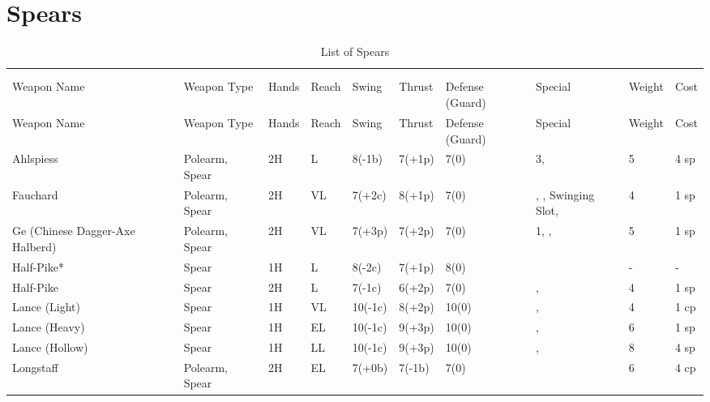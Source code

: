 \documentclass[oneside,11pt,english]{book}
\begin{document}
\section{Spears}\vspace{-15pt}
\begin{longtabu} to 1\linewidth {X[2,l] X X[-1,c] X[-1,c] XX X[-1,c] X[2,l] X[-3,c] X[-3,r]}
	\captionsetup{labelformat=blank,textformat=empty}
	\caption{List of Spears}\vspace{-15pt}\\
	\label{tab:Spears}\\
	Weapon Name						&Weapon Type			&Hands	&Reach	&Swing		&Thrust	&Defense (Guard)	&Special																	&Weight	&Cost\\\toprule\endfirsthead
Weapon Name						&Weapon Type			&Hands	&Reach	&Swing		&Thrust	&Defense (Guard)	&Special																	&Weight	&Cost\\\toprule\endhead
Ahlspiess 						&Polearm, Spear			&2H		&L		&8(-1b)		&7(+1p) &7(0)				& 3, 													&5		&4 sp\\
Fauchard 						&Polearm, Spear			&2H		&VL 	&7(+2c)		&8(+1p) &7(0)				&, , Swinging Slot,								&4		&1 sp\\
Ge (Chinese Dagger-Axe Halberd)	&Polearm, Spear			&2H		&VL 	&7(+3p)		&7(+2p) &7(0)				& 1, , 											&5		&1 sp\\
Half-Pike*						&Spear					&1H		&L		&8(-2c)		&7(+1p) &8(0)				&																&-		&-\\
Half-Pike 						&Spear 					&2H		&L		&7(-1c)		&6(+2p) &7(0)				&,  													&4		&1 sp\\
Lance (Light) 					&Spear 					&1H		&VL		&10(-1c)	&8(+2p) &10(0)				&,  												&4		&1 cp\\
Lance (Heavy) 					&Spear 					&1H		&EL		&10(-1c)	&9(+3p) &10(0)				&,  												&6		&1 sp\\
Lance (Hollow) 					&Spear 					&1H		&LL		&10(-1c)	&9(+3p) &10(0)				&,  												&8		&4 sp\\
Longstaff 						&Polearm, Spear			&2H		&EL		&7(+0b)		&7(-1b) &7(0)				&																&6		&4 cp\\

\end{longtabu}
\end{document}
